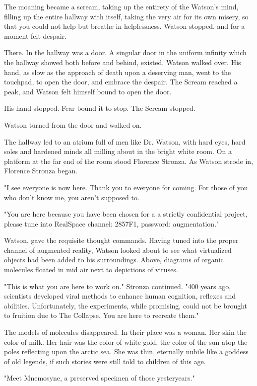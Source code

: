 \documentclass[12pt]{article}
\begin{document}
The moaning became a scream, taking up the entirety of the Watson's mind, filling up the entire hallway with itself, taking the very air for its own misery, so that you could not help but breathe in helplessness. Watson stopped, and for a moment felt despair.

There. In the hallway was a door. A singular door in the uniform infinity which the hallway showed both before and behind, existed. Watson walked over. His hand, as slow as the approach of death upon a deserving man, went to the touchpad, to open the door, and embrace the despair. The Scream reached a peak, and Watson felt himself bound to open the door. 

His hand stopped. Fear bound it to stop. The Scream stopped.

Watson turned from the door and walked on.

The hallway led to an atrium full of men like Dr. Watson, with hard eyes, hard soles and hardened minds all milling about in the bright white room. On a platform at the far end of the room stood Florence Stronza. As Watson strode in, Florence Stronza began.

"I see everyone is now here. Thank you to everyone for coming. For those of you who don't know me, you aren't supposed to.

"You are here because you have been chosen for a a strictly confidential project, please tune into RealSpace channel: 2857F1, password: augmentation."

Watson, gave the requisite thought commands. Having tuned into the proper channel of augmented reality, Watson looked about to see what virtualized objects had been added to his surroundings. Above, diagrams of organic molecules floated in mid air next to depictions of viruses.

"This is what you are here to work on." Stronza continued. "400 years ago, scientists developed viral methods to enhance human cognition, reflexes and abilities. Unfortunately, the experiments, while promising, could not be brought to fruition due to The Collapse. You are here to recreate them."

The models of molecules disappeared. In their place was a woman. Her skin the color of milk. Her hair was the color of white gold, the color of the sun atop the poles reflecting upon the arctic sea. She was thin, eternally nubile like a goddess of old legends, if such stories were still told to children of this age.

"Meet Mnemosyne, a preserved specimen of those yesteryears."
\end{document}
